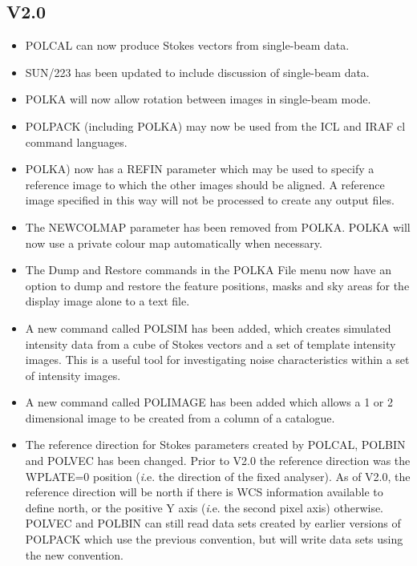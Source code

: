 \documentclass[twoside,11pt]{article}
\newcommand{\htmlref}[2]{#1}
\renewcommand{\_}{\texttt{\symbol{95}}}
\begin{document}
\subsection{V2.0}

\begin{itemize}

\item \htmlref{POLCAL}{POLCAL} can now produce Stokes vectors from
single-beam data.

\item SUN/223 has been updated to include discussion of single-beam data.

\item \htmlref{POLKA}{POLKA} will now allow rotation between images in
single-beam mode.

\item POLPACK (including \htmlref{POLKA}{POLKA}) may now be used from the
ICL and IRAF cl command languages.

\item \htmlref{POLKA}{POLKA}) now has a REFIN parameter which may be used
to specify a reference image to which the other images should be aligned.
A reference image specified in this way will not be processed to create
any output files.

\item The NEWCOLMAP parameter has been removed from \htmlref{POLKA}{POLKA}.
POLKA will now use a private colour map automatically when necessary.

\item The Dump and Restore commands in the \htmlref{POLKA}{POLKA} File menu
now have an option to dump and restore the feature positions, masks and sky 
areas for the display image alone to a text file.

\item A new command called \htmlref{POLSIM}{POLSIM} has been added, which
creates simulated intensity data from a cube of Stokes vectors and a set
of template intensity images. This is a useful tool for investigating
noise characteristics within a set of intensity images.

\item A new command called \htmlref{POLIMAGE}{POLIMAGE} has been added
which allows a 1 or 2 dimensional image to be created from a column of a 
catalogue. 

\item The reference direction for Stokes parameters created by
\htmlref{POLCAL}{POLCAL}, \htmlref{POLBIN}{POLBIN} and
\htmlref{POLVEC}{POLVEC} has been changed.
Prior to V2.0 the reference direction was the WPLATE=0 position ({\emph
i.e.} the direction of the fixed analyser). As of V2.0, the reference
direction will be north if there is WCS information available to define
north, or the positive Y axis ({\emph i.e.} the second pixel axis)
otherwise. \htmlref{POLVEC}{POLVEC} and \htmlref{POLBIN}{POLBIN} can still read data sets
created by earlier versions of POLPACK which use the previous convention, but will 
write data sets using the new convention.


\end{itemize}
\end{document}
